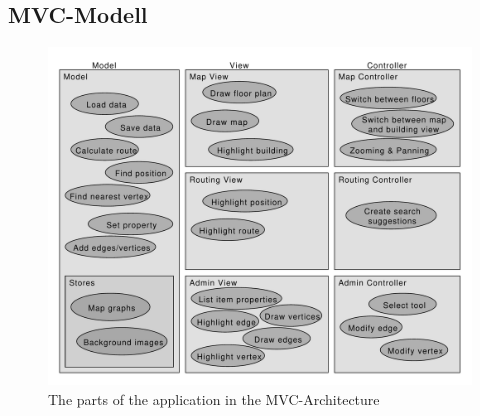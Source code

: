 \subsection{MVC-Modell}

\vspace{-0.8cm}
\begin{figure}[h]
	\centering
	\includegraphics[scale=0.5]{diagrams/mvc.pdf}
	\caption{The parts of the application in the MVC-Architecture}
\end{figure}

